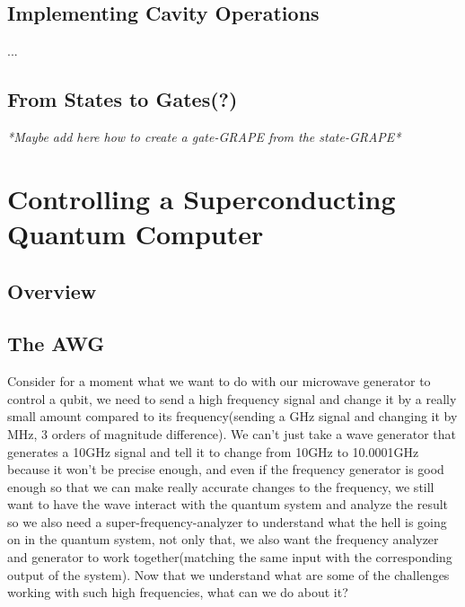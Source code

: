 \documentclass[english, a4paper, 12pt, twoside]{article}
\numberwithin{equation}{section} %
\begin{document}
\subsection{Implementing Cavity Operations}
...
\subsection{From States to Gates(?)}
\textit{*Maybe add here how to create a gate-GRAPE from the state-GRAPE*}


\newpage
\section{Controlling a Superconducting Quantum Computer} \label{chap:FPGA}
\subsection{Overview}
\subsection{The AWG}
Consider for a moment what we want to do with our microwave generator to control a qubit, we need to send a high frequency signal and change it by a really small amount compared to its frequency(sending a GHz signal and changing it by MHz, 3 orders of magnitude difference). We can't just take a wave generator that generates a 10GHz signal and tell it to change from 10GHz to 10.0001GHz because it won't be precise enough, and even if the frequency generator is good enough so that we can make really accurate changes to the frequency, we still want to have the wave interact with the quantum system and analyze the result so we also need a super-frequency-analyzer to understand what the hell is going on in the quantum system, not only that, we also want the frequency analyzer and generator to work together(matching the same input with the corresponding output of the system). Now that we understand what are some of the challenges working with such high frequencies, what can we do about it?
\end{document}
